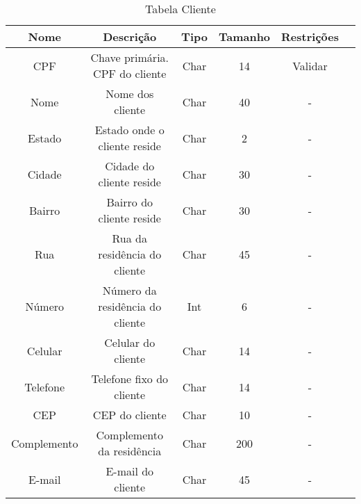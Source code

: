 %
\begin{table}[htbp]
\caption{Tabela Cliente}
\begin{center}
\begin{tabular}{|c|c|c|c|c|c|}
\hline
Nome & Descrição & Tipo & Tamanho & Restrições \\ \hline
CPF & Chave primária. CPF do cliente & Char & 14 & Validar \\ \hline
Nome & Nome dos cliente & Char & 40 & - \\ \hline
Estado & Estado onde o cliente reside & Char & 2 & - \\ \hline
Cidade & Cidade do cliente reside& Char & 30 & - \\ \hline
Bairro & Bairro do cliente reside& Char & 30 & - \\ \hline
Rua & Rua da residência do cliente& Char & 45 & - \\ \hline
Número & Número da residência do cliente & Int & 6 & - \\ \hline
Celular & Celular do cliente & Char & 14 & - \\ \hline
Telefone & Telefone fixo do cliente & Char & 14 & - \\ \hline
CEP & CEP do cliente & Char & 10 & - \\ \hline
Complemento & Complemento da residência& Char & 200 & - \\ \hline
E-mail & E-mail do cliente & Char & 45 & - \\ \hline
\end{tabular}
\end{center}
\label{tabela_cliente}
\end{table}
%
%

